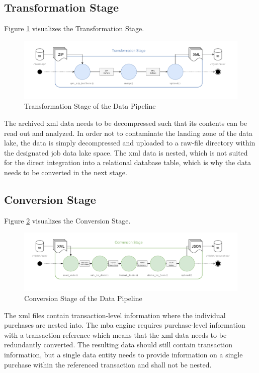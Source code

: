 \newpage

\subsection{Transformation Stage}
Figure \ref{fig:3-transform} visualizes the Transformation Stage.

\begin{figure}[h!]
	\includegraphics[width=\linewidth]{main-matter/img/3-3-1-transform}
	\caption{Transformation Stage of the Data Pipeline}
	\label{fig:3-transform}	
\end{figure}

The archived \ac{xml} data needs to be decompressed such that its contents can be read out and analyzed. In order not to contaminate the landing zone of the data lake, the data is simply decompressed and uploaded to a raw-file directory within the designated job data lake space. The \ac{xml} data is nested, which is not suited for the direct integration into a relational database table, which is why the data needs to be converted in the next stage.

\subsection{Conversion Stage} \label{sec:3-3-conversion}
Figure \ref{fig:3-convert} visualizes the Conversion Stage.

\begin{figure}[h!]
	\includegraphics[width=\linewidth]{main-matter/img/3-3-2-convert}
	\caption{Conversion Stage of the Data Pipeline}
	\label{fig:3-convert}	
\end{figure}

The \ac{xml} files contain transaction-level information where the individual purchases are nested into. The \ac{mba} engine requires purchase-level information with a transaction reference which means that the \ac{xml} data needs to be redundantly converted. The resulting data should still contain transaction information, but a single data entity needs to provide information on a single purchase within the referenced transaction and shall not be nested.

